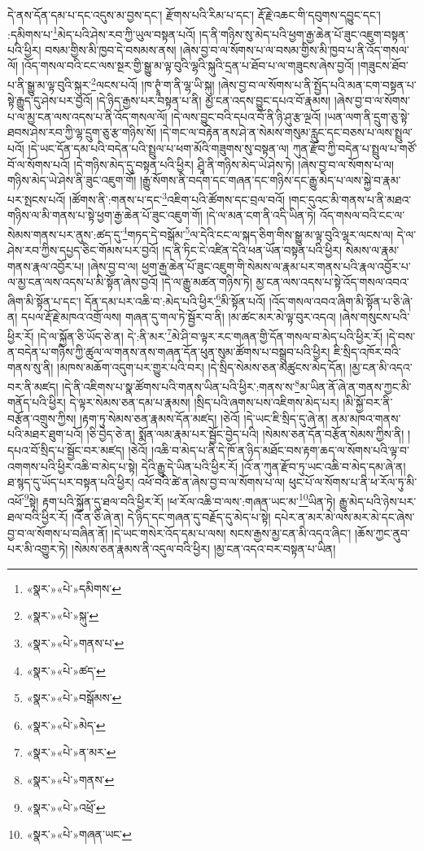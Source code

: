 དེ་ནས་དོན་དམ་པ་དང་འདུས་མ་བྱས་དང་། རྫོགས་པའི་རིམ་པ་དང་། རྡོ་རྗེ་འཆང་གི་དབུགས་དབྱུང་དང་། :དམིགས་པ་\footnote{«སྣར་»«པེ་»དམིགས་}མེད་པའི་ཤེས་རབ་ཀྱི་ཡུལ་བསྟན་པའོ། །ད་ནི་གཉིས་སུ་མེད་པའི་ཕྱག་རྒྱ་ཆེན་པོ་ཟུང་འཇུག་བསྟན་པའི་ཕྱིར། བསམ་གྱིས་མི་ཁྱབ་དེ་བསམས་ནས། །ཞེས་བྱ་བ་ལ་སོགས་པ་ལ་བསམ་གྱིས་མི་ཁྱབ་པ་ནི་འོད་གསལ་ལོ། །འོད་གསལ་བའི་ངང་ལས་སྔར་གྱི་སྒྱུ་མ་ལྟ་བུའི་ལྷའི་སྐུའི་དྲན་པ་ཐོབ་པ་ལ་གཟུངས་ཞེས་བྱའོ། །གཟུངས་ཐོབ་པ་ནི་སྒྱུ་མ་ལྟ་བུའི་སྐུར་\footnote{«སྣར་»«པེ་»སྐུ་}ལངས་པའོ། །ཁ་ཊྭཱཾ་ག་ནི་ལྷ་ཡི་སྐུ། །ཞེས་བྱ་བ་ལ་སོགས་པ་ནི་སྤྱོད་པའི་མན་ངག་བསྟན་པ་སྟེ་རྒྱུད་དུ་ཤེས་པར་བྱའོ། །དེ་ཉིད་རྒྱས་པར་བསྟན་པ་ནི། མྱ་ངན་འདས་བྱུང་དཔའ་བོ་རྣམས། །ཞེས་བྱ་བ་ལ་སོགས་པ་ལ་མྱ་ངན་ལས་འདས་པ་ནི་འོད་གསལ་ལོ། །དེ་ལས་བྱུང་བའི་དཔའ་བོ་ནི་ཉི་ཤུ་རྩ་ལྔའོ། །ཡན་ལག་ནི་དྲུག་ཅུ་སྟེ་ཐབས་ཤེས་རབ་ཀྱི་ལྷ་དྲུག་ཅུ་རྩ་གཉིས་སོ། །དེ་གང་ལ་བརྟེན་ནས་ཤེ་ན་སེམས་གསུམ་རླུང་དང་བཅས་པ་ལས་སྤྲུལ་པའོ། །དེ་ཡང་དོན་དམ་པའི་བདེན་པའི་སྤྲུལ་པ་ཕག་མོའི་གཟུགས་སུ་བསྟན་ལ། ཀུན་རྫོབ་ཀྱི་བདེན་པ་སྤྲུལ་པ་གཙོ་བོ་ལ་སོགས་པའོ། །དེ་གཉིས་མེད་དུ་བསྟན་པའི་ཕྱིར། ཤྲཱི་ནི་གཉིས་མེད་ཡེ་ཤེས་ཏེ། །ཞེས་བྱ་བ་ལ་སོགས་པ་ལ། གཉིས་མེད་ཡེ་ཤེས་ནི་ཟུང་འཇུག་གོ། །རྒྱུ་སོགས་ནི་བདག་དང་གཞན་དང་གཉིས་དང་རྒྱུ་མེད་པ་ལས་སྐྱེ་བ་རྣམ་པར་སྤངས་པའོ། །ཚོགས་ནི་:གནས་པ་དང་\footnote{«སྣར་»«པེ་»གནས་པ་}འཇིག་པའི་ཚོགས་དང་བྲལ་བའོ། །གང་དུའང་མི་གནས་པ་ནི་མཐའ་གཉིས་ལ་མི་གནས་པ་སྟེ་ཕྱག་རྒྱ་ཆེན་པོ་ཟུང་འཇུག་གོ། །དེ་ལ་མན་ངག་ནི་འདི་ཡིན་ཏེ། འོད་གསལ་བའི་ངང་ལ་སེམས་གནས་པར་ནུས་:ཚད་དུ་\footnote{«སྣར་»«པེ་»ཚད་}གཏད་དེ་བསྒོམ་\footnote{«སྣར་»«པེ་»བསྒོམས་}ལ་དེའི་ངང་ལ་སྐད་ཅིག་གིས་སྒྱུ་མ་ལྟ་བུའི་ལྷར་ལངས་ལ། དེ་ལ་ཤེས་རབ་ཀྱིས་དཔྱད་ཅིང་གོམས་པར་བྱའོ། །ད་ནི་ཏིང་ངེ་འཛིན་དེའི་ཕན་ཡོན་བསྟན་པའི་ཕྱིར། སེམས་ལ་རྣམ་གནས་རྣལ་འབྱོར་པ། །ཞེས་བྱ་བ་ལ། ཕྱག་རྒྱ་ཆེན་པོ་ཟུང་འཇུག་གི་སེམས་ལ་རྣམ་པར་གནས་པའི་རྣལ་འབྱོར་པ་ལ་མྱ་ངན་ལས་འདས་པ་མི་སྟོན་ཞེས་བྱའོ། །དེ་ལ་རྒྱུ་མཚན་གཉིས་ཏེ། མྱ་ངན་ལས་འདས་པ་སྟེ་འོད་གསལ་འབའ་ཞིག་མི་སྟོན་པ་དང་། དོན་དམ་པར་འཆི་བ་:མེད་པའི་ཕྱིར་\footnote{«སྣར་»«པེ་»མེད་}མི་སྟོན་པའོ། །འོད་གསལ་འབའ་ཞིག་མི་སྟོན་པ་ཅི་ཞེ་ན། དཔལ་རྡོ་རྗེ་མཁའ་འགྲོ་ལས། གཞན་དུ་གལ་ཏེ་སྦྱོར་བ་ནི། །མ་ཚང་མར་མེ་ལྟ་བུར་འདའ། །ཞེས་གསུངས་པའི་ཕྱིར་རོ། །དེ་ལ་སྐྱོན་ཅི་ཡོད་ཅེ་ན། དེ་:ནི་མར་\footnote{«སྣར་»«པེ་»ན་མར་}མེ་ཤི་བ་ལྟར་རང་གཞན་གྱི་དོན་གསལ་བ་མེད་པའི་ཕྱིར་རོ། །དེ་བས་ན་བདེན་པ་གཉིས་ཀྱི་ཚུལ་ལ་གནས་ནས་གཞན་དོན་ཕུན་སུམ་ཚོགས་པ་བསྒྲུབ་པའི་ཕྱིར། ཇི་སྲིད་འཁོར་བའི་གནས་སུ་ནི། །མཁས་མཆོག་འདུག་པར་གྱུར་པའི་བར། །དེ་སྲིད་སེམས་ཅན་མཚུངས་མེད་དོན། །མྱ་ངན་མི་འདའ་བར་ནི་མཛད། །དེ་ནི་འཇིགས་པ་སྣ་ཚོགས་པའི་གནས་ཡིན་པའི་ཕྱིར་:གནས་ས་\footnote{«སྣར་»«པེ་»གནས་}མ་ཡིན་ནོ་ཞེ་ན་གནས་ཀྱང་མི་གནོད་པའི་ཕྱིར། དེ་ལྟར་སེམས་ཅན་དམ་པ་རྣམས། །སྲིད་པའི་ཞགས་པས་འཇིགས་མེད་པར། །མི་སྐྱོ་བར་ནི་བརྩོན་འགྲུས་ཀྱིས། །རྟག་ཏུ་སེམས་ཅན་རྣམས་དོན་མཛད། །ཅེའོ། །དེ་ཡང་ཇི་སྲིད་དུ་ཞེ་ན། ནམ་མཁའ་གནས་པའི་མཐར་ཐུག་པའོ། །ཅི་བྱེད་ཅེ་ན། སྨོན་ལམ་རྣམ་པར་སྦྱོང་བྱེད་པའི། །སེམས་ཅན་དོན་བརྩོན་སེམས་ཀྱིས་ནི། །དཔའ་བོ་སྲིད་པ་སྦྱོང་བར་མཛད། །ཅེའོ། །འཆི་བ་མེད་པ་ནི་དེ་ཁོ་ན་ཉིད་མཐོང་བས་རྟག་ཆད་ལ་སོགས་པའི་ལྟ་བ་འགགས་པའི་ཕྱིར་འཆི་བ་མེད་པ་སྟེ། དེའི་རྒྱུ་དེ་ཡིན་པའི་ཕྱིར་རོ། །འོ་ན་ཀུན་རྫོབ་ཏུ་ཡང་འཆི་བ་མེད་དམ་ཞེ་ན། ཐ་སྙད་དུ་ཡོད་པར་བསྟན་པའི་ཕྱིར། འཕོ་བའི་ཚེ་ན་ཞེས་བྱ་བ་ལ་སོགས་པ་ལ། ཕུང་པོ་ལ་སོགས་པ་ནི་ཕ་རོལ་ཏུ་མི་འཕོ་\footnote{«སྣར་»«པེ་»འཕྲོ་}སྟེ། རྟག་པའི་སྐྱོན་དུ་ཐལ་བའི་ཕྱིར་རོ། །ཕ་རོལ་འཆི་བ་ལས་:གཞན་ཡང་མ་\footnote{«སྣར་»«པེ་»གཞན་ཡང་}ཡིན་ཏེ། རྒྱུ་མེད་པའི་ཉེས་པར་ཐལ་བའི་ཕྱིར་རོ། །འོ་ན་ཅི་ཞེ་ན། དེ་ཉིད་དང་གཞན་དུ་བརྗོད་དུ་མེད་པ་སྟེ། དཔེར་ན་མར་མེ་ལས་མར་མེ་དང་ཞེས་བྱ་བ་ལ་སོགས་པ་བཞིན་ནོ། །དེ་ཡང་གསེར་འོད་དམ་པ་ལས། སངས་རྒྱས་མྱ་ངན་མི་འདའ་ཞིང་། །ཆོས་ཀྱང་ནུབ་པར་མི་འགྱུར་ཏེ། །སེམས་ཅན་རྣམས་ནི་འདུལ་བའི་ཕྱིར། །མྱ་ངན་འདའ་བར་བསྟན་པ་ཡིན། 